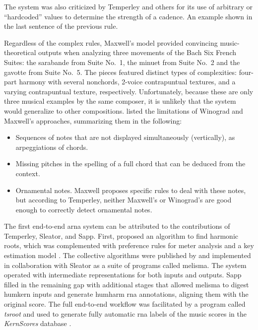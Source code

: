 The system was also criticized by Temperley and others for
its use of arbitrary or ``hardcoded'' values to determine
the strength of a cadence. An example shown in the last
sentence of the previous rule.

Regardless of the complex rules, Maxwell's model provided
convincing music-theoretical outputs when analyzing three
movements of the Bach Six French Suites: the sarabande from
Suite No.~1, the minuet from Suite No.~2 and the gavotte
from Suite No.~5. The pieces featured distinct types of
complexities: four-part harmony with several
\gls{nonchord}s, 2-voice contrapuntual textures, and a
varying contrapuntual texture, respectively. Unfortunately,
because these are only three musical examples by the same
composer, it is unlikely that the system would generalize to
other compositions. \textcite{temperley1997algorithm} listed
the limitations of Winograd and Maxwell's approaches,
summarizing them in the following:

\begin{itemize}
    \item Sequences of notes that are not displayed
    simultaneously (vertically), as arpeggiations of chords.
    \item Missing pitches in the spelling of a full chord
    that can be deduced from the context.
    \item Ornamental notes. Maxwell proposes specific rules
    to deal with these notes, but according to Temperley,
    neither Maxwell's or Winograd's are good enough to
    correctly detect ornamental notes.
\end{itemize}


The first end-to-end \gls{arna} system can be attributed to
the contributions of Temperley, Sleator, and Sapp. First,
\textcite{temperley1997algorithm} proposed an algorithm to
find harmonic roots, which was complemented with preference
rules for meter analysis \parencite{temperley1999modeling}
and a key estimation model \parencite{temperley1999whats}.
The collective algorithms were published by
\textcite{temperley2004cognition} and implemented in
collaboration with Sleator as a suite of programs called
\gls{melisma}.
The system operated with intermediate representations for
both inputs and outputs. Sapp filled in the remaining gap
with additional stages that allowed \gls{melisma} to digest
\gls{humkern} inputs and generate \gls{humharm} \gls{rna}
annotations, aligning them with the original score. The full
end-to-end workflow was facilitated by a program called
\emph{tsroot} \parencite{sapp2009tsroot} and used to
generate fully automatic \gls{rna} labels of the music
scores in the \emph{KernScores} database
\parencite{sapp2005online}.

